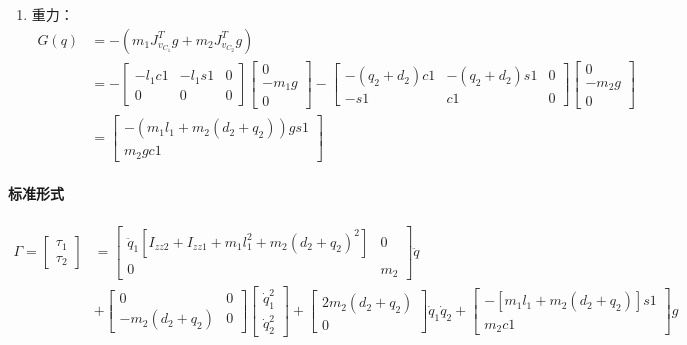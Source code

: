 \documentclass[
12pt, %
a4paper, 
oneside, %
headinclude,footinclude, %
]{scrartcl}
\begin{document}
{\begin{enumerate}
\begin{align*}
\end{align*}
\item 重力：
\begin{align*}
G(q) &= -(m_1 J_{v_{C_1}}^T g + m_2 J_{v_{C_2}}^T g) \\
&= -\begin{bmatrix} -l_1 c1 & -l_1 s1 & 0 \\ 0 & 0 & 0 \end{bmatrix} \begin{bmatrix} 0 \\ -m_1 g \\ 0 \end{bmatrix} - \begin{bmatrix} -(q_2 + d_2)c1 & -(q_2 + d_2)s1 & 0 \\ -s1 & c1 & 0 \end{bmatrix} \begin{bmatrix} 0 \\ -m_2 g \\ 0 \end{bmatrix} \\
&= \begin{bmatrix} -(m_1 l_1 + m_2(d_2 + q_2))gs1 \\ m_2 gc1 \end{bmatrix}
\end{align*}
\end{enumerate}
\paragraph{标准形式}
\begin{align*}
\Gamma = \begin{bmatrix} \tau_1 \\ \tau_2 \end{bmatrix} 
&= \begin{bmatrix} \ddot{q}_1[I_{zz2} + I_{zz1} + m_1l_1^2 + m_2(d_2 + q_2)^2] & 0 \\ 0 & m_2 \end{bmatrix} \ddot{q} \\
&+ \begin{bmatrix} 0 & 0 \\ -m_2(d_2 + q_2) & 0 \end{bmatrix} \begin{bmatrix} \dot{q}_1^2\\ \dot{q}_2^2 \end{bmatrix} 
+ \begin{bmatrix} 2m_2(d_2 + q_2) \\ 0 \end{bmatrix} \dot{q}_1 \dot{q}_2 
+ \begin{bmatrix} -[m_1l_1 + m_2(d_2 + q_2)]s1 \\ m_2 c1 \end{bmatrix} g 
\end{align*}
}
\end{document}
